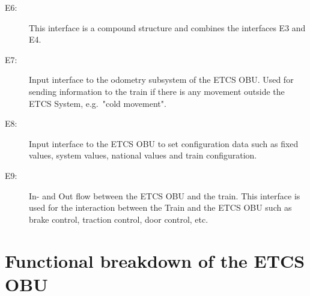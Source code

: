 \begin{description}
\item[E6:] This interface is a compound structure and combines the interfaces E3 and E4.

\item[E7:] Input interface to the odometry subsystem of the ETCS OBU. Used for sending information to the train if there is any movement outside the ETCS System, e.g.~"cold movement".

\item[E8:] Input interface to the ETCS OBU to set configuration data such as fixed values, system values, national values and train configuration.

\item[E9:] In- and Out flow between the ETCS OBU and the train. This interface is used for the interaction between the Train and the ETCS OBU such as brake control, traction control, door control, etc.
\end{description}


\section{Functional breakdown of the ETCS OBU}

